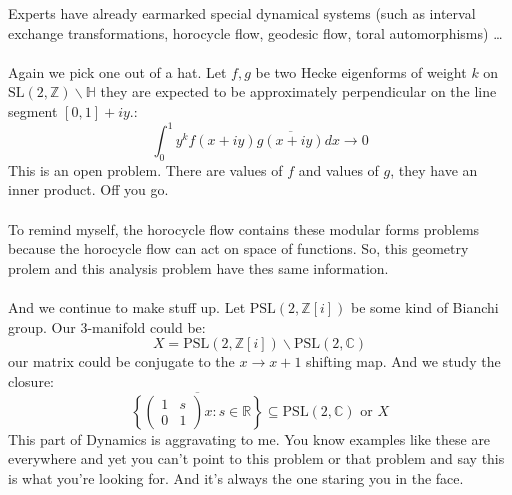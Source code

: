 \documentclass[12pt]{article}
\begin{document}
\noindent Experts have already earmarked special dynamical systems (such as interval exchange transformations, horocycle flow, geodesic flow, toral automorphisms)  \dots \\ \\
Again we pick one out of a hat.  Let $f, g$ be two Hecke eigenforms of weight $k$ on $ \mathrm{SL}(2, \mathbb{Z}) \backslash \mathbb{H}$ they are expected to be approximately perpendicular on the line segment $[0,1] + iy$.:
$$ \int_0^1 y^k f(x+iy)\overline{g(x+iy)} dx \to 0 $$
This is an open problem.  There are values of $f$ and values of $g$, they have an inner product.  Off you go. \\\\
To remind myself, the horocycle flow contains these modular forms problems because the horocycle flow can act on space of functions.  So, this geometry prolem and this analysis problem have thes same information. \\ \\
And we continue to make stuff up.  Let $\mathrm{PSL}(2, \mathbb{Z}[i])$ be some kind of Bianchi group.  Our 3-manifold could be:
$$ X = \mathrm{PSL}(2, \mathbb{Z}[i]) \backslash \mathrm{PSL}(2, \mathbb{C})$$
our matrix could be conjugate to the $x \to x+1$ shifting map. And we study the closure:
$$ \overline{ \left\{ \left( \begin{array}{cc} 1 & s \\ 0 & 1\end{array} \right)x : s \in \mathbb{R} \right\}  }   \subseteq \mathrm{PSL}(2, \mathbb{C}) \text{ or }X $$
This part of Dynamics is aggravating to me.  You know examples like these are everywhere and yet you can't point to this problem or that problem and say this is what you're looking for.  And it's always the one staring you in the face.
 
\newpage
\end{document}
